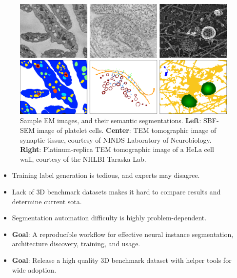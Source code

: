 \documentclass[final]{beamer}
\newlength{\onecolwid}
\renewcommand{\emph}[1]{{\color{nibib2} #1}}
\begin{document}
\begin{frame}[t]
\begin{columns}[t]
\begin{column}{\onecolwid}
    \begin{center}
        \begin{figure}
            \includegraphics[width=\linewidth]{fig/segmentationintroshort.png}
            \caption{Sample EM images, and their semantic segmentations. \textbf{Left}: SBF-SEM image of platelet cells. \textbf{Center}: TEM tomographic image of synaptic tissue, courtesy of NINDS Laboratory of Neurobiology. \textbf{Right}: Platinum-replica TEM tomographic image of a HeLa cell wall, courtesy of the NHLBI Taraska Lab.}
        \end{figure}
    \end{center}
    
    \begin{tcolorbox}[title=Segmentation Challenges]
        \begin{itemize}
            \item Training \emph{label generation} is tedious, and experts may disagree.
            \item Lack of \emph{3D benchmark datasets} makes it hard to compare results and determine current sota.  %
            \item Segmentation automation difficulty is highly \emph{problem-dependent}.
            \item \textbf{Goal}: A \emph{reproducible workflow} for effective neural instance segmentation, architecture discovery, training, and usage.
            \item \textbf{Goal}: Release a high quality 3D benchmark dataset with helper tools for wide adoption. %
        \end{itemize}
    \end{tcolorbox}


\end{column}
\end{columns}
\end{frame}
\end{document}
